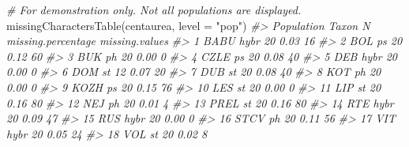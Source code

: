 \documentclass[
  11pt,
  a4paper]{article}
\newenvironment{Shaded}{\begin{snugshade}}{\end{snugshade}}
\newcommand{\AttributeTok}[1]{\textcolor[rgb]{0.77,0.63,0.00}{#1}}
\newcommand{\CommentTok}[1]{\textcolor[rgb]{0.56,0.35,0.01}{\textit{#1}}}
\newcommand{\FunctionTok}[1]{\textcolor[rgb]{0.00,0.00,0.00}{#1}}
\newcommand{\NormalTok}[1]{#1}
\newcommand{\StringTok}[1]{\textcolor[rgb]{0.31,0.60,0.02}{#1}}
\begin{document}
\begin{Shaded}
\begin{Highlighting}[]
\CommentTok{\# For demonstration only. Not all populations are displayed.}
\FunctionTok{missingCharactersTable}\NormalTok{(centaurea, }\AttributeTok{level =} \StringTok{"pop"}\NormalTok{)}
\CommentTok{\#\textgreater{}    Population Taxon  N missing.percentage missing.values}
\CommentTok{\#\textgreater{} 1        BABU  hybr 20               0.03             16}
\CommentTok{\#\textgreater{} 2         BOL    ps 20               0.12             60}
\CommentTok{\#\textgreater{} 3         BUK    ph 20               0.00              0}
\CommentTok{\#\textgreater{} 4        CZLE    ps 20               0.08             40}
\CommentTok{\#\textgreater{} 5         DEB  hybr 20               0.00              0}
\CommentTok{\#\textgreater{} 6         DOM    st 12               0.07             20}
\CommentTok{\#\textgreater{} 7         DUB    st 20               0.08             40}
\CommentTok{\#\textgreater{} 8         KOT    ph 20               0.00              0}
\CommentTok{\#\textgreater{} 9        KOZH    ps 20               0.15             76}
\CommentTok{\#\textgreater{} 10        LES    st 20               0.00              0}
\CommentTok{\#\textgreater{} 11        LIP    st 20               0.16             80}
\CommentTok{\#\textgreater{} 12        NEJ    ph 20               0.01              4}
\CommentTok{\#\textgreater{} 13       PREL    st 20               0.16             80}
\CommentTok{\#\textgreater{} 14        RTE  hybr 20               0.09             47}
\CommentTok{\#\textgreater{} 15        RUS  hybr 20               0.00              0}
\CommentTok{\#\textgreater{} 16       STCV    ph 20               0.11             56}
\CommentTok{\#\textgreater{} 17        VIT  hybr 20               0.05             24}
\CommentTok{\#\textgreater{} 18        VOL    st 20               0.02              8}
\end{Highlighting}
\end{Shaded}
\end{document}
